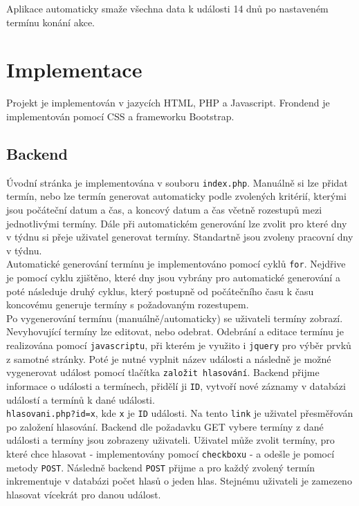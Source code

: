 \documentclass[11pt, a4paper]{article}
\begin{document}
Aplikace automaticky smaže všechna data k události 14 dnů po nastaveném termínu konání akce.

\section{Implementace}
Projekt je implementován v jazycích HTML, PHP a Javascript. Frondend je implementován pomocí CSS a frameworku Bootstrap.
\subsection{Backend}
Úvodní stránka je implementována v souboru \texttt{index.php}. Manuálně si lze přidat termín, nebo lze termín generovat automaticky podle zvolených kritérií, kterými jsou počáteční datum a čas, a koncový datum a čas včetně rozestupů mezi jednotlivými termíny. Dále při automatickém generování lze zvolit pro které dny v týdnu si přeje uživatel generovat termíny. Standartně jsou zvoleny pracovní dny v týdnu.\\

Automatické generování termínu je implementováno pomocí cyklů \texttt{for}. Nejdřive je pomocí cyklu zjištěno, které dny jsou vybrány pro automatické generování a poté následuje druhý cyklus, který postupně od počátečního času k času koncovému generuje termíny s požadovaným rozestupem.\\

Po vygenerování termínu (manuálně/automaticky) se uživateli termíny zobrazí. Nevyhovující termíny lze editovat, nebo odebrat. Odebrání a editace termínu je realizována pomocí \texttt{javascriptu}, při kterém je využito i \texttt{jquery} pro výběr prvků z samotné stránky. Poté je nutné vyplnit název události a následně je možné vygenerovat událost pomocí tlačítka \texttt{založit hlasování}. 
Backend přijme informace o události a termínech, přidělí ji \texttt{ID}, vytvoří nové záznamy v databázi událostí a termínů k dané události. \\

\texttt{hlasovani.php?id=x}, kde \texttt{x} je \texttt{ID} události. Na tento \texttt{link} je uživatel přesměřován po založení hlasování. Backend dle požadavku GET vybere termíny z dané události a termíny jsou zobrazeny uživateli. Uživatel může zvolit termíny, pro které chce hlasovat - implementovány pomocí \texttt{checkboxu} - a odešle je pomocí metody \texttt{POST}. Následně backend \texttt{POST} přijme a pro každý zvolený termín inkrementuje v databázi počet hlasů o jeden hlas. Stejnému uživateli je zamezeno hlasovat vícekrát pro danou událost.\\
\end{document}
